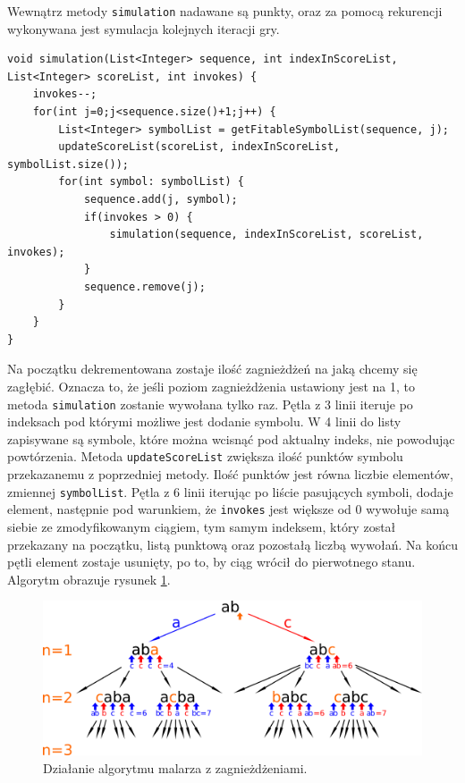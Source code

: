 \documentclass[document]{xmgr}
\begin{document}
Wewnątrz metody \texttt{simulation} nadawane są punkty, oraz za pomocą rekurencji wykonywana jest symulacja kolejnych iteracji gry.

\begin{lstlisting}[frame=single]
void simulation(List<Integer> sequence, int indexInScoreList, List<Integer> scoreList, int invokes) {
	invokes--;
	for(int j=0;j<sequence.size()+1;j++) {
		List<Integer> symbolList = getFitableSymbolList(sequence, j);
		updateScoreList(scoreList, indexInScoreList, symbolList.size());
		for(int symbol: symbolList) {
			sequence.add(j, symbol);
			if(invokes > 0) {
				simulation(sequence, indexInScoreList, scoreList, invokes);
			}
			sequence.remove(j);
		}
	}
}
\end{lstlisting}

Na początku dekrementowana zostaje ilość zagnieżdżeń na jaką chcemy się zagłębić. Oznacza to, że jeśli poziom zagnieżdżenia ustawiony jest na 1, to metoda \texttt{simulation} zostanie wywołana tylko raz. Pętla z 3 linii iteruje po indeksach pod którymi możliwe jest dodanie symbolu. W 4 linii do listy zapisywane są symbole, które można wcisnąć pod aktualny indeks, nie powodując powtórzenia. Metoda \texttt{updateScoreList} zwiększa ilość punktów symbolu przekazanemu z poprzedniej metody. Ilość punktów jest równa liczbie elementów, zmiennej \texttt{symbolList}. Pętla z 6 linii iterując po liście pasujących symboli, dodaje element, następnie pod warunkiem, że \texttt{invokes} jest większe od 0 wywołuje samą siebie ze zmodyfikowanym ciągiem, tym samym indeksem, który został przekazany na początku, listą punktową oraz pozostałą liczbą wywołań. Na końcu pętli element zostaje usunięty, po to, by ciąg wrócił do pierwotnego stanu. Algorytm obrazuje rysunek \ref{fig:nestingPainter}.

\begin{figure}[tbh]
    \centering
    \includegraphics[width = \textwidth]{images/nestingPainter}
    \caption{Działanie algorytmu malarza z zagnieżdżeniami.}
    \label{fig:nestingPainter}
\end{figure}
\end{document}
